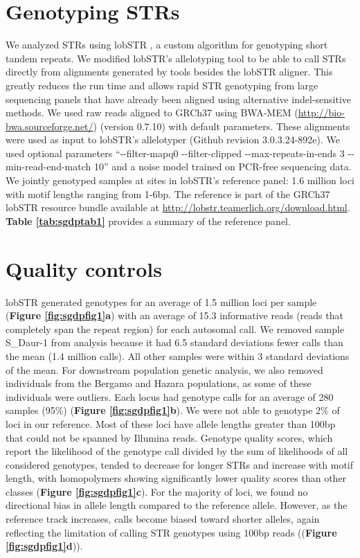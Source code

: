 \section{Genotyping STRs}
We analyzed STRs using lobSTR \cite{GymrekGolanRossetEtAl2012}, a custom algorithm for genotyping short tandem repeats. We modified lobSTR's allelotyping tool to be able to call STRs directly from alignments generated by tools besides the lobSTR aligner. This greatly reduces the run time and allows rapid STR genotyping from large sequencing panels that have already been aligned using alternative indel-sensitive methods. We used raw reads aligned to GRCh37 using BWA-MEM (\url{http://bio-bwa.sourceforge.net/}) (version 0.7.10) with default parameters. These alignments were used as input to lobSTR's allelotyper (Github revision 3.0.3.24-892e). We used optional parameters ``-{}-filter-mapq0 -{}-filter-clipped -{}-max-repeats-in-ends 3 -{}-min-read-end-match 10'' and a noise model trained on PCR-free sequencing data. We jointly genotyped samples at sites in lobSTR's reference panel: 1.6 million loci with motif lengths ranging from 1-6bp. The reference is part of the GRCh37 lobSTR resource bundle available at \url{http://lobstr.teamerlich.org/download.html}. \textbf{Table \ref{tab:sgdptab1}} provides a summary of the reference panel.

\section{Quality controls}
lobSTR generated genotypes for an average of 1.5 million loci per sample (\textbf{Figure \ref{fig:sgdpfig1}a}) with an average of 15.3 informative reads (reads that completely span the repeat region) for each autosomal call. We removed sample S\_Daur-1 from analysis because it had 6.5 standard deviations fewer calls than the mean (1.4 million calls). All other samples were within 3 standard deviations of the mean. For downstream population genetic analysis, we also removed individuals from the Bergamo and Hazara populations, as some of these individuals were outliers. Each locus had genotype calls for an average of 280 samples (95\%) (\textbf{Figure \ref{fig:sgdpfig1}b}). We were not able to genotype 2\% of loci in our reference. Most of these loci have allele lengths greater than 100bp that could not be spanned by Illumina reads. Genotype quality scores, which report the likelihood of the genotype call divided by the sum of likelihoods of all considered genotypes, tended to decrease for longer STRs and increase with motif length, with homopolymers showing significantly lower quality scores than other classes (\textbf{Figure \ref{fig:sgdpfig1}c}). For the majority of loci, we found no directional bias in allele length compared to the reference allele. However, as the reference track increases, calls become biased toward shorter alleles, again reflecting the limitation of calling STR genotypes using 100bp reads ((\textbf{Figure \ref{fig:sgdpfig1}d})).

